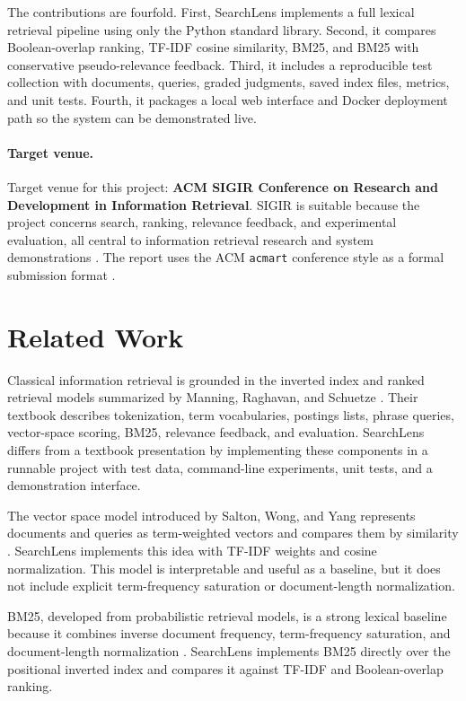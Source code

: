 \documentclass[sigconf,nonacm]{acmart}
\begin{document}
The contributions are fourfold. First, SearchLens implements a full lexical retrieval pipeline using only the Python standard library. Second, it compares Boolean-overlap ranking, TF-IDF cosine similarity, BM25, and BM25 with conservative pseudo-relevance feedback. Third, it includes a reproducible test collection with documents, queries, graded judgments, saved index files, metrics, and unit tests. Fourth, it packages a local web interface and Docker deployment path so the system can be demonstrated live.

\paragraph{Target venue.} Target venue for this project: \textbf{ACM SIGIR Conference on Research and Development in Information Retrieval}. SIGIR is suitable because the project concerns search, ranking, relevance feedback, and experimental evaluation, all central to information retrieval research and system demonstrations \cite{acmsigir2026}. The report uses the ACM \texttt{acmart} conference style as a formal submission format \cite{acmart2025}.

\section{Related Work}
Classical information retrieval is grounded in the inverted index and ranked retrieval models summarized by Manning, Raghavan, and Schuetze \cite{manning2008ir}. Their textbook describes tokenization, term vocabularies, postings lists, phrase queries, vector-space scoring, BM25, relevance feedback, and evaluation. SearchLens differs from a textbook presentation by implementing these components in a runnable project with test data, command-line experiments, unit tests, and a demonstration interface.

The vector space model introduced by Salton, Wong, and Yang represents documents and queries as term-weighted vectors and compares them by similarity \cite{salton1975vector}. SearchLens implements this idea with TF-IDF weights and cosine normalization. This model is interpretable and useful as a baseline, but it does not include explicit term-frequency saturation or document-length normalization.

BM25, developed from probabilistic retrieval models, is a strong lexical baseline because it combines inverse document frequency, term-frequency saturation, and document-length normalization \cite{robertson1994bm25}. SearchLens implements BM25 directly over the positional inverted index and compares it against TF-IDF and Boolean-overlap ranking.
\end{document}

